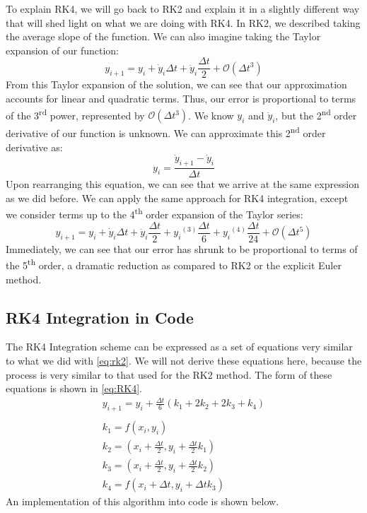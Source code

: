 \documentclass[10pt, openany, titlepage]{book}
\theoremstyle{definition}
\begin{document}
To explain RK4, we will go back to RK2 and explain it in a slightly different way that will shed light on what we are doing with RK4. In RK2, we described taking the average slope of the function. We can also imagine taking the Taylor expansion of our function:
$$y_{i+1}=y_i+\dot{y}_i\Delta t+\ddot{y}_i\frac{\Delta t}{2}+\mathcal{O}\left(\Delta t^3\right)$$
From this Taylor expansion of the solution, we can see that our approximation accounts for linear and quadratic terms. Thus, our error is proportional to terms of the 3\textsuperscript{rd} power, represented by $\mathcal{O}(\Delta t^3)$. We know $y_i$ and $\dot{y}_i$, but the 2\textsuperscript{nd} order derivative of our function is unknown. We can approximate this 2\textsuperscript{nd} order derivative as:
$$y_i=\frac{\dot{y}_{i+1}-\dot{y}_i}{\Delta t}$$
Upon rearranging this equation, we can see that we arrive at the same expression as we did before. We can apply the same approach for RK4 integration, except we consider terms up to the 4\textsuperscript{th} order expansion of the Taylor series:
$$y_{i+1}=y_i+\dot{y}_i\Delta t+\ddot{y}_i\frac{\Delta t}{2}+{y_i}^{(3)}\frac{\Delta t}{6}+{y_i}^{(4)}\frac{\Delta t}{24}+\mathcal{O}\left(\Delta t^5\right)$$
Immediately, we can see that our error has shrunk to be proportional to terms of the 5\textsuperscript{th} order, a dramatic reduction as compared to RK2 or the explicit Euler method.

\subsection{RK4 Integration in Code}
The RK4 Integration scheme can be expressed as a set of equations very similar to what we did with \eqref{eq:rk2}. We will not derive these equations here, because the process is very similar to that used for the RK2 method. The form of these equations is shown in \eqref{eq:RK4}.
\begin{gather}\label{eq:RK4}
    y_{i+1}=y_i+\frac{\Delta t}{6}\left(k_1+2k_2+2k_3+k_4\right)\\\\
    k_1=f(x_i,y_i)\\
    k_2=\left(x_i+\frac{\Delta t}{2},y_i+\frac{\Delta t}{2}k_1\right)\\
    k_3=\left(x_i+\frac{\Delta t}{2},y_i+\frac{\Delta t}{2}k_2\right)\\
    k_4=f(x_i+\Delta t,y_i+\Delta tk_3)
\end{gather}
An implementation of this algorithm into code is shown below.
\end{document}
